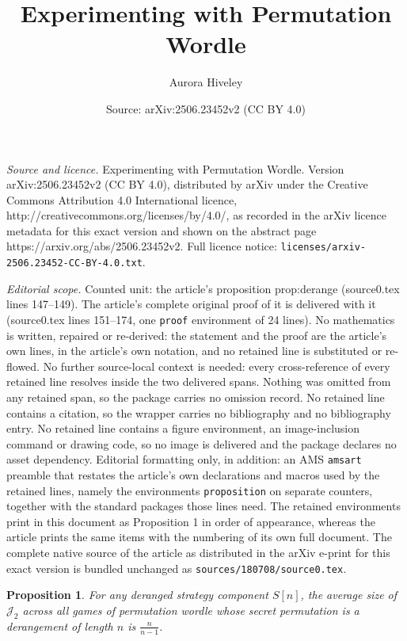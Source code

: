 \documentclass[10pt,a4paper]{amsart}
\title{Experimenting with Permutation Wordle}
\author{Aurora Hiveley}
\date{Source: arXiv:2506.23452v2 (CC BY 4.0)}
\newtheorem{proposition}{Proposition}
\begin{document}
\maketitle

\noindent\emph{Source and licence.} Experimenting with Permutation Wordle. Version arXiv:2506.23452v2 (CC BY 4.0), distributed by arXiv under the Creative Commons Attribution 4.0 International licence, http://creativecommons.org/licenses/by/4.0/, as recorded in the arXiv licence metadata for this exact version and shown on the abstract page https://arxiv.org/abs/2506.23452v2. Full licence notice: \texttt{licenses/arxiv-2506.23452-CC-BY-4.0.txt}.\par\smallskip

\noindent\textit{Editorial scope.} Counted unit: the article's proposition prop:derange (source0.tex lines 147--149). The article's complete original proof of it is delivered with it (source0.tex lines 151--174, one \texttt{proof} environment of 24 lines). No mathematics is written, repaired or re-derived: the statement and the proof are the article's own lines, in the article's own notation, and no retained line is substituted or re-flowed.  No further source-local context is needed: every cross-reference of every retained line resolves inside the two delivered spans.  Nothing was omitted from any retained span, so the package carries no omission record.  No retained line contains a citation, so the wrapper carries no bibliography and no bibliography entry.  No retained line contains a figure environment, an image-inclusion command or drawing code, so no image is delivered and the package declares no asset dependency.  Editorial formatting only, in addition: an AMS \texttt{amsart} preamble that restates the article's own declarations and macros used by the retained lines, namely the environments \texttt{proposition} on separate counters, together with the standard packages those lines need.  The retained environments print in this document as Proposition 1 in order of appearance, whereas the article prints the same items with the numbering of its own full document.  The complete native source of the article as distributed in the arXiv e-print for this exact version is bundled unchanged as \texttt{sources/180708/source0.tex}.
\begin{proposition} \label{prop:derange}
    For any deranged strategy component $S[n]$, the average size of $\mathcal{J}_2$ across all games of permutation wordle whose secret permutation is a derangement of length $n$ is $\frac{n}{n-1}$.
\end{proposition}
\end{document}
